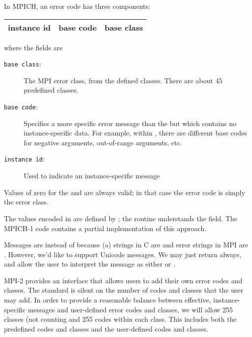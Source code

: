 \documentclass[dvipdfm]{article}
\begin{document}
In MPICH, an error code has three components:

\begin{center}
\begin{tabular}{|c|c|c|}
\hline
instance id&base code&base class\\
\hline
\end{tabular}
\end{center}
where the fields are
\begin{description}
\item[\texttt{base class}:]The MPI error class, from the defined
classes.  There are about 45 predefined classes.

\item[\texttt{base code}:]Specifies a more specific error message than
the  but which contains no instance-specific data.
For example, within , there are different base codes
for negative arguments, out-of-range arguments, etc.

\item[\texttt{instance id}:]Used to indicate an instance-specific message
\end{description}

Values of zero for the  and  are
always valid; in that case the error code is simply the error class.

The values encoded in  are defined by
; the routine 
understands the  field.  The MPICH-1 code contains a
partial implementation of this approach.

Messages are  instead of  because (a)
strings in C are  and error strings in MPI are .  However, we'd like to support Unicode messages.  We may just
return  always, and allow the user to interpret the
message as either  or .

MPI-2 provides an interface that allows users to add their own error
codes and classes.  The standard is silent on the number of codes and
classes that the user may add.  In order to provide a reasonable
balance between effective, instance-specific messages and user-defined
error codes and classes, we will allow 255 classes (not counting
 and 255
codes within each class.  This includes both the predefined codes and
classes and the user-defined codes and classes.
\end{document}
